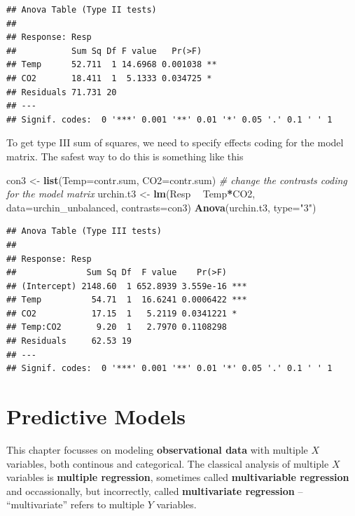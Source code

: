\documentclass[]{book}
\newenvironment{Shaded}{\begin{snugshade}}{\end{snugshade}}
\newcommand{\KeywordTok}[1]{\textcolor[rgb]{0.13,0.29,0.53}{\textbf{#1}}}
\newcommand{\DataTypeTok}[1]{\textcolor[rgb]{0.13,0.29,0.53}{#1}}
\newcommand{\StringTok}[1]{\textcolor[rgb]{0.31,0.60,0.02}{#1}}
\newcommand{\CommentTok}[1]{\textcolor[rgb]{0.56,0.35,0.01}{\textit{#1}}}
\newcommand{\OperatorTok}[1]{\textcolor[rgb]{0.81,0.36,0.00}{\textbf{#1}}}
\newcommand{\NormalTok}[1]{#1}
\begin{document}
\begin{verbatim}
## Anova Table (Type II tests)
## 
## Response: Resp
##           Sum Sq Df F value   Pr(>F)   
## Temp      52.711  1 14.6968 0.001038 **
## CO2       18.411  1  5.1333 0.034725 * 
## Residuals 71.731 20                    
## ---
## Signif. codes:  0 '***' 0.001 '**' 0.01 '*' 0.05 '.' 0.1 ' ' 1
\end{verbatim}

To get type III sum of squares, we need to specify effects coding for
the model matrix. The safest way to do this is something like this

\begin{Shaded}
\begin{Highlighting}[]
\NormalTok{con3 <-}\StringTok{ }\KeywordTok{list}\NormalTok{(}\DataTypeTok{Temp=}\NormalTok{contr.sum, }\DataTypeTok{CO2=}\NormalTok{contr.sum) }\CommentTok{# change the contrasts coding for the model matrix}
\NormalTok{urchin.t3 <-}\StringTok{ }\KeywordTok{lm}\NormalTok{(Resp }\OperatorTok{~}\StringTok{ }\NormalTok{Temp}\OperatorTok{*}\NormalTok{CO2, }\DataTypeTok{data=}\NormalTok{urchin_unbalanced, }\DataTypeTok{contrasts=}\NormalTok{con3)}
\KeywordTok{Anova}\NormalTok{(urchin.t3, }\DataTypeTok{type=}\StringTok{"3"}\NormalTok{)}
\end{Highlighting}
\end{Shaded}

\begin{verbatim}
## Anova Table (Type III tests)
## 
## Response: Resp
##              Sum Sq Df  F value    Pr(>F)    
## (Intercept) 2148.60  1 652.8939 3.559e-16 ***
## Temp          54.71  1  16.6241 0.0006422 ***
## CO2           17.15  1   5.2119 0.0341221 *  
## Temp:CO2       9.20  1   2.7970 0.1108298    
## Residuals     62.53 19                       
## ---
## Signif. codes:  0 '***' 0.001 '**' 0.01 '*' 0.05 '.' 0.1 ' ' 1
\end{verbatim}

\chapter{Predictive Models}\label{predictive-models}

This chapter focusses on modeling \textbf{observational data} with
multiple \(X\) variables, both continous and categorical. The classical
analysis of multiple \(X\) variables is \textbf{multiple regression},
sometimes called \textbf{multivariable regression} and occassionally,
but incorrectly, called \textbf{multivariate regression} --
``multivariate'' refers to multiple \(Y\) variables.
\end{document}
